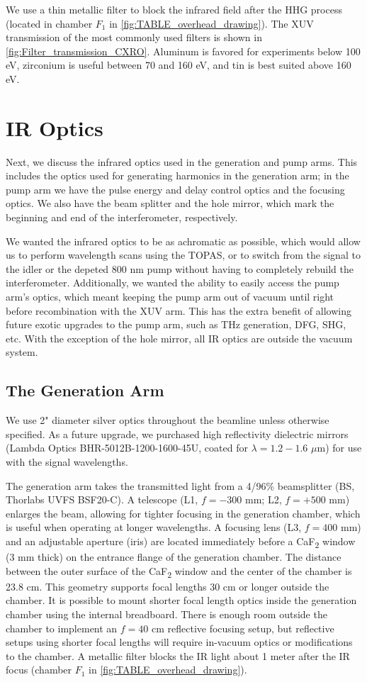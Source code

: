 We use a thin metallic filter to block the infrared field after the HHG process (located in chamber $F_1$ in \cref{fig:TABLE_overhead_drawing}). The XUV transmission of the most commonly used filters is shown in \cref{fig:Filter_transmission_CXRO}. Aluminum is favored for experiments below 100 eV, zirconium is useful between 70 and 160 eV, and tin is best suited above 160 eV. 

\section{IR Optics}
Next, we discuss the infrared optics used in the generation and pump arms. This includes the optics used for generating harmonics in the generation arm; in the pump arm we have the pulse energy and delay control optics and the focusing optics. We also have the beam splitter and the hole mirror, which mark the beginning and end of the interferometer, respectively.

We wanted the infrared optics to be as achromatic as possible, which would allow us to perform wavelength scans using the TOPAS, or to switch from the signal to the idler or the depeted 800 nm pump without having to completely rebuild the interferometer. Additionally, we wanted the ability to easily access the pump arm's optics, which meant keeping the pump arm out of vacuum until right before recombination with the XUV arm. This has the extra benefit of allowing future exotic upgrades to the pump arm, such as THz generation, DFG, SHG, etc. With the exception of the hole mirror, all IR optics are outside the vacuum system. 

\subsection{The Generation Arm}

We use 2" diameter silver optics throughout the beamline unless otherwise specified. As a future upgrade, we purchased high reflectivity dielectric mirrors (Lambda Optics BHR-5012B-1200-1600-45U, coated for $\lambda = 1.2 - 1.6$ $\mu$m) for use with the signal wavelengths.

The generation arm takes the transmitted light from a 4/96\% beamsplitter (BS, Thorlabs UVFS BSF20-C). A telescope (L1, $f = - 300$ mm; L2, $f = + 500$ mm) enlarges the beam, allowing for tighter focusing in the generation chamber, which is useful when operating at longer wavelengths. A focusing lens (L3, $f= 400$ mm) and an adjustable aperture (iris) are located immediately before a CaF\textsubscript{2} window (3 mm thick) on the entrance flange of the generation chamber. The distance between the outer surface of the CaF\textsubscript{2} window and the center of the chamber is 23.8 cm. This geometry supports focal lengths 30 cm or longer outside the chamber. It is possible to mount shorter focal length optics inside the generation chamber using the internal breadboard. There is enough room outside the chamber to implement an $f = 40$ cm reflective focusing setup, but reflective setups using shorter focal lengths will require in-vacuum optics or modifications to the chamber. A metallic filter blocks the IR light about 1 meter after the IR focus (chamber $F_1$ in \cref{fig:TABLE_overhead_drawing}).

